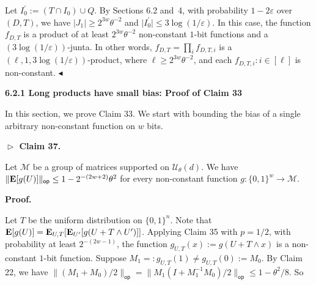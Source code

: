 \documentclass[10pt,a4paper]{article}
\begin{document}
Let $I_{0}^{\prime}:=(T\cap I_{0})\cup Q$.
By Sections 6.2 and 4, with probability $1-2\varepsilon$ over $(D,T)$, we have $\lvert J_{1}\rvert\geq 2^{3w}\theta^{-2}$ and $\lvert I_{0}^{\prime}\rvert\leq 3\log(1/\varepsilon)$.
In this case, the function $f_{D,T}$ is a product of at least $2^{3w}\theta^{-2}$ non-constant $1$-bit functions and a $(3\log(1/\varepsilon))$-junta.
In other words, $f_{D,T}=\prod_{i}f_{D,T,i}$ is a $(\ell,1,3\log(1/\varepsilon))$-product, where $\ell\geq 2^{3w}\theta^{-2}$, and each $f_{D,T,i}:i\in[\ell]$ is non-constant.
$\blacktriangleleft$\par





\par\medskip\noindent\textbf{
6.2.1 Long products have small bias: Proof of Claim 33
}\par




In this section, we prove Claim 33.
We start with bounding the bias of a single arbitrary non-constant function on $w$ bits.\par





\par\medskip\noindent\textbf{
$\vartriangleright$ Claim 37. }\par



Let $\mathcal{M}$ be a group of matrices supported on $\mathcal{U}_{\theta}(d)$.
We have $\lVert\mathop{\bf E\/}[g(U)]\rVert_{\mathsf{op}}\leq 1-2^{-(2w+2)}\theta^{2}$ for every non-constant function $g\colon\{0,1\}^{w}\to\mathcal{M}$.\par






\par\medskip\noindent\textbf{
\textbf{Proof}.}\par




Let $T$ be the uniform distribution on $\{0,1\}^{n}$.
Note that $\mathop{\bf E\/}[g(U)]=\mathop{\bf E\/}_{U,T}[\mathop{\bf E\/}_{U^{\prime}}[g(U+T\wedge U^{\prime})]]$.
Applying Claim 35 with $p=1/2$, with probability at least $2^{-(2w-1)}$, the function $g_{U,T}(x):=g(U+T\wedge x)$ is a non-constant $1$-bit function.
Suppose $M_{1}=:g_{U,T}(1)\neq g_{U,T}(0):=M_{0}$.
By Claim 22, we have $\lVert(M_{1}+M_{0})/2\rVert_{\mathsf{op}}=\lVert M_{1}(I+M_{1}^{-1}M_{0})/2\rVert_{\mathsf{op}}\leq 1-\theta^{2}/8$.
So\par
\end{document}
